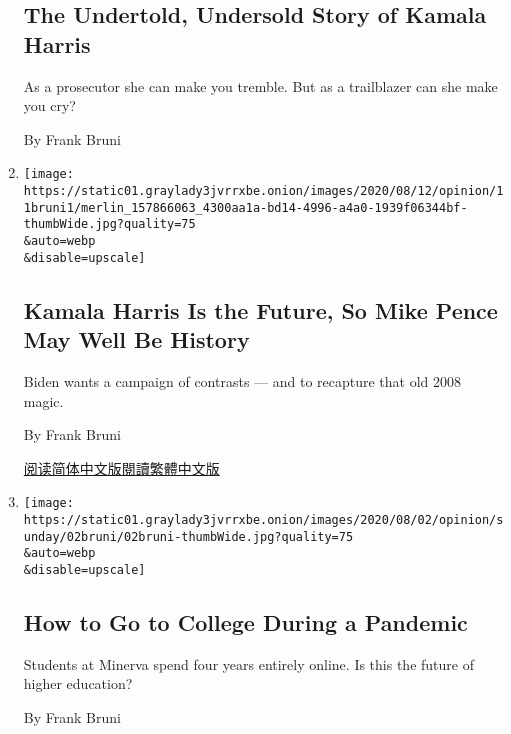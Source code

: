 \begin{enumerate}
  \hypertarget{the-undertold-undersold-story-of-kamala-harris}{%
  \subsection{The Undertold, Undersold Story of Kamala
  Harris}\label{the-undertold-undersold-story-of-kamala-harris}}

  As a prosecutor she can make you tremble. But as a trailblazer can she
  make you cry?

  By Frank Bruni
\item
  \href{/2020/08/11/opinion/kamala-harris-biden-running-mate.html}{}

  \texttt{[image: https://static01.graylady3jvrrxbe.onion/images/2020/08/12/opinion/11bruni1/merlin\_157866063\_4300aa1a-bd14-4996-a4a0-1939f06344bf-thumbWide.jpg?quality=75\\\&auto=webp\\\&disable=upscale]}

  \hypertarget{kamala-harris-is-the-future-so-mike-pence-may-well-be-history}{%
  \subsection{Kamala Harris Is the Future, So Mike Pence May Well Be
  History}\label{kamala-harris-is-the-future-so-mike-pence-may-well-be-history}}

  Biden wants a campaign of contrasts --- and to recapture that old 2008
  magic.

  By Frank Bruni

  \href{https://cn.nytimes3xbfgragh.onion/opinion/20200812/kamala-harris-biden-running-mate/}{阅读简体中文版}\href{https://cn.nytimes3xbfgragh.onion/opinion/20200812/kamala-harris-biden-running-mate/zh-hant/}{閱讀繁體中文版}
\item
  \href{/2020/08/01/opinion/sunday/minerva-college-coronavirus.html}{}

  \texttt{[image: https://static01.graylady3jvrrxbe.onion/images/2020/08/02/opinion/sunday/02bruni/02bruni-thumbWide.jpg?quality=75\\\&auto=webp\\\&disable=upscale]}

  \hypertarget{how-to-go-to-college-during-a-pandemic}{%
  \subsection{How to Go to College During a
  Pandemic}\label{how-to-go-to-college-during-a-pandemic}}

  Students at Minerva spend four years entirely online. Is this the
  future of higher education?

  By Frank Bruni
\end{enumerate}

